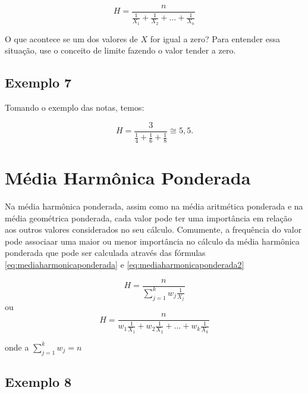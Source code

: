 \documentclass[
]{book}
\begin{document}
\begin{equation}
    H = \frac{n}{\frac{1}{X_1} + \frac{1}{X_2} + \ldots + \frac{1}{X_n}}
    \label{eq:mediaharmonicasimples2}
\end{equation}

O que acontece se um dos valores de \(X\) for igual a zero? Para entender essa situação, use o conceito de limite fazendo o valor tender a zero.

\hypertarget{exemplo-7}{%
\subsection{Exemplo 7}\label{exemplo-7}}

Tomando o exemplo das notas, temos:

\begin{equation*}
    H = \frac{3}{\frac{1}{4} + \frac{1}{6} + \frac{1}{8}}\cong 5,5.
\end{equation*}

\hypertarget{muxe9dia-harmuxf4nica-ponderada}{%
\section{Média Harmônica Ponderada}\label{muxe9dia-harmuxf4nica-ponderada}}

Na média harmônica ponderada, assim como na média aritmética ponderada e na média geométrica ponderada, cada valor pode ter uma importância em relação aos outros valores considerados no seu cálculo. Comumente, a frequência do valor pode associaar uma maior ou menor importância no cálculo da média harmônica ponderada que pode ser calculada através das fórmulas \eqref{eq:mediaharmonicaponderada} e \eqref{eq:mediaharmonicaponderada2}

\begin{equation}
    H = \frac{n}{\sum_{j=1}^{k}w_{j}\frac{1}{X_j}}
    \label{eq:mediaharmonicaponderada}
\end{equation}
ou
\begin{equation}
    H = \frac{n}{w_1\frac{1}{X_1} + w_2\frac{1}{X_2} + \ldots + w_k \frac{1}{X_k}}
    \label{eq:mediaharmonicaponderada2}
\end{equation}

onde a \(\sum_{j=1}^{k} w_j = n\)

\hypertarget{exemplo-8}{%
\subsection{Exemplo 8}\label{exemplo-8}}
\end{document}
